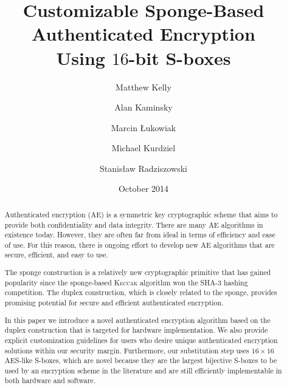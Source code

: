 \documentclass[11pt,american]{article}
\title{Customizable Sponge-Based Authenticated Encryption \\ Using $16$-bit S-boxes}
\author[1]{Matthew Kelly}
\author[2]{Alan Kaminsky}
\author[1]{Marcin {\L}ukowiak}
\author[3]{\authorcr Michael Kurdziel}
\author[2]{Stanis{\l}aw Radziszowski}
\affil[1]{\footnotesize Department of Computer Engineering, Rochester Institute of Technology}
\affil[2]{Department of Computer Science, Rochester Institute of Technology}
\affil[3]{Harris Corporation, Rochester, NY}
\date{October 2014}
\newcommand{\TODO}{\textcolor{red}{\textbf{TODO}}\xspace}
\newcommand{\Keccak}{\textsc{Keccak}\xspace}
\begin{document}
\maketitle

\begin{abstract}
Authenticated encryption (AE) is a symmetric key cryptographic scheme that aims to provide both confidentiality and data integrity. 
There are many AE algorithms in existence today.
However, they are often far from ideal in terms of efficiency and ease of use.
For this reason, there is ongoing effort to develop new AE algorithms that are secure, efficient, and easy to use.

The sponge construction is a relatively new cryptographic primitive that has gained popularity since the sponge-based \Keccak algorithm won the SHA-3 hashing competition.
The duplex construction, which is closely related to the sponge, provides promising potential for secure and efficient authenticated encryption.

In this paper we introduce a novel authenticated encryption algorithm based on the duplex construction that is targeted for hardware implementation.
We also provide explicit customization guidelines for users who desire unique authenticated encryption solutions within our security margin.
Furthermore, our substitution step uses $16 \times 16$ AES-like S-boxes, which are novel because they are the largest bijective S-boxes to be used by an encryption scheme in the literature and are still efficiently implementable in both hardware and software.
\end{abstract}







\linespread{1}
\selectfont


\end{document}
